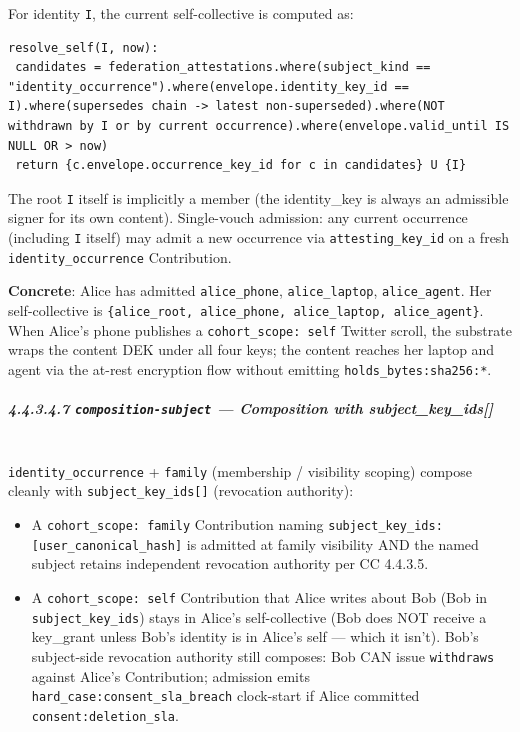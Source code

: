 \documentclass[11pt]{article}
\begin{document}
For identity \texttt{I}, the current self-collective is computed as:


\begin{lstlisting}
resolve_self(I, now):
 candidates = federation_attestations.where(subject_kind == "identity_occurrence").where(envelope.identity_key_id == I).where(supersedes chain -> latest non-superseded).where(NOT withdrawn by I or by current occurrence).where(envelope.valid_until IS NULL OR > now)
 return {c.envelope.occurrence_key_id for c in candidates} U {I}
\end{lstlisting}

The root \texttt{I} itself is implicitly a member (the identity\_key is always an admissible signer for its own content). Single-vouch admission: any current occurrence (including \texttt{I} itself) may admit a new occurrence via \texttt{attesting\_key\_id} on a fresh \texttt{identity\_occurrence} Contribution.


\textbf{Concrete}: Alice has admitted \texttt{alice\_phone}, \texttt{alice\_laptop}, \texttt{alice\_agent}. Her self-collective is \texttt{\{alice\_root, alice\_phone, alice\_laptop, alice\_agent\}}. When Alice's phone publishes a \texttt{cohort\_scope: self} Twitter scroll, the substrate wraps the content DEK under all four keys; the content reaches her laptop and agent via the at-rest encryption flow without emitting \texttt{holds\_bytes:sha256:*}.


\subparagraph{4.4.3.4.7 \texttt{composition-subject} — Composition with subject\_key\_ids[]}\mbox{}\\


\texttt{identity\_occurrence} + \texttt{family} (membership / visibility scoping) compose cleanly with \texttt{subject\_key\_ids[]} (revocation authority):


\begin{itemize}\setlength\itemsep{0pt}
\item A \texttt{cohort\_scope: family} Contribution naming \texttt{subject\_key\_ids: [user\_canonical\_hash]} is admitted at family visibility AND the named subject retains independent revocation authority per CC 4.4.3.5.
\item A \texttt{cohort\_scope: self} Contribution that Alice writes about Bob (Bob in \texttt{subject\_key\_ids}) stays in Alice's self-collective (Bob does NOT receive a key\_grant unless Bob's identity is in Alice's self — which it isn't). Bob's subject-side revocation authority still composes: Bob CAN issue \texttt{withdraws} against Alice's Contribution; admission emits \texttt{hard\_case:consent\_sla\_breach} clock-start if Alice committed \texttt{consent:deletion\_sla}.
\end{itemize}
\end{document}
